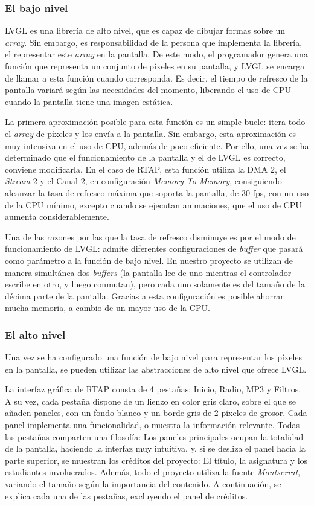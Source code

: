 \subsubsection{El bajo nivel}
LVGL es una librería de alto nivel, que es capaz de dibujar formas sobre un \textit{array}. Sin embargo, es responsabilidad de la persona que implementa la librería, el representar este \textit{array} en la pantalla. De este modo, el programador genera una función que representa un conjunto de píxeles en su pantalla, y LVGL se encarga de llamar a esta función cuando corresponda. Es decir, el tiempo de refresco de la pantalla variará según las necesidades del momento, liberando el uso de CPU cuando la pantalla tiene una imagen estática.

La primera aproximación posible para esta función es un simple bucle: itera todo el \textit{array} de píxeles y los envía a la pantalla. Sin embargo, esta aproximación es muy intensiva en el uso de CPU, además de poco eficiente. Por ello, una vez se ha determinado que el funcionamiento de la pantalla y el de LVGL es correcto, conviene modificarla. En el caso de RTAP, esta función utiliza la DMA 2, el \textit{Stream} 2 y el Canal 2, en configuración \textit{Memory To Memory}, consiguiendo alcanzar la tasa de refresco máxima que soporta la pantalla, de 30 fps, con un uso de la CPU mínimo, excepto cuando se ejecutan animaciones, que el uso de CPU aumenta considerablemente.

Una de las razones por las que la tasa de refresco disminuye es por el modo de funcionamiento de LVGL: admite diferentes configuraciones de \textit{buffer} que pasará como parámetro a la función de bajo nivel. En nuestro proyecto se utilizan de manera simultánea dos \textit{buffers} (la pantalla lee de uno mientras el controlador escribe en otro, y luego conmutan), pero cada uno solamente es del tamaño de la décima parte de la pantalla. Gracias a esta configuración es posible ahorrar mucha memoria, a cambio de un mayor uso de la CPU.

\subsubsection{El alto nivel}
Una vez se ha configurado una función de bajo nivel para representar los píxeles en la pantalla, se pueden utilizar las abstracciones de alto nivel que ofrece LVGL. 

La interfaz gráfica de RTAP consta de 4 pestañas: Inicio, Radio, MP3 y Filtros. A su vez, cada pestaña dispone de un lienzo en color gris claro, sobre el que se añaden paneles, con un fondo blanco y un borde gris de 2 píxeles de grosor. Cada panel implementa una funcionalidad, o muestra la información relevante. Todas las pestañas comparten una filosofía: Los paneles principales ocupan la totalidad de la pantalla, haciendo la interfaz muy intuitiva, y, si se desliza el panel hacia la parte superior, se muestran los créditos del proyecto: El título, la asignatura y los estudiantes involucrados. Además, todo el proyecto utiliza la fuente \textit{Montserrat}, variando el tamaño según la importancia del contenido. A continuación, se explica cada una de las pestañas, excluyendo el panel de créditos. 

